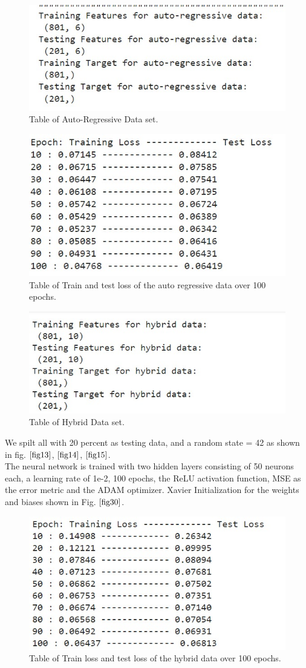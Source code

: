 \documentclass[english,12pt, titlepage]{article}
\begin{document}
	
	
	\begin{figure}[!ht]
		\centering
		\includegraphics[width=0.5\linewidth]{auto.jpeg}
		\caption{Table of Auto-Regressive Data set.}	\label{fig14}
	\end{figure}
	
	\begin{figure}[!ht]
		\centering
		\includegraphics[width=0.5\linewidth]{eauto.jpeg}
		\caption{Table of Train and test loss of the auto regressive data over 100 epochs.}\label{fig18}
	\end{figure}
	
	
	
	
	\begin{figure}[!ht]
		\centering
		\includegraphics[width=0.6\linewidth]{hyb.jpeg}
		\caption{Table of Hybrid Data set.}	\label{fig15}
	\end{figure}
	
	We spilt all with 20 percent as testing data, and a random state = 42 as shown in fig. $\ref{fig13}$, $\ref{fig14}$, $\ref{fig15}$.\\
	The neural network is trained with two hidden layers consisting of 50 neurons each, a learning rate of 1e-2, 100 epochs, the ReLU activation function,  MSE as the error metric and the ADAM optimizer. Xavier Initialization for the weights and biases shown in Fig. $\ref{fig30}$.
	
	
	\begin{figure}[!ht]
		\centering
		\includegraphics[width=0.5\linewidth]{Ehyb.jpeg}
		\caption{Table of Train loss and test loss of the hybrid data over 100 epochs.}\label{fig19}
	\end{figure}
	
\end{document}
